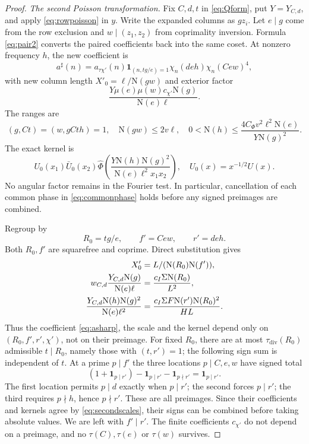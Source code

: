 \documentclass[11pt,a4paper]{article}
\numberwithin{equation}{section}
\theoremstyle{definition}
\theoremstyle{remark}
\newcommand{\N}{\mathrm N}
\newcommand{\ind}{\mathbf 1}
\newcommand{\wt}{\widehat}
\newcommand{\tauD}{\tau_{\mathrm{div}}}
\begin{document}
\begin{proof}
\emph{The second Poisson transformation.} Fix $C,d,t$ in \eqref{eq:Qform}, put $Y=Y_{C,d}$, and apply \eqref{eq:rowpoisson} in $y$. Write the expanded columns as $gz_i$. Let $e\mid g$ come from the row exclusion and $w\mid(z_1,z_2)$ from coprimality inversion. Formula \eqref{eq:pair2} converts the paired coefficients back into the same coset. At nonzero frequency $h$, the new coefficient is
\begin{equation}\label{eq:asharp}
 a^\sharp(n)=a_{\tau\chi'}(n)\ind_{(n,tg/e)=1}\chi_n(deh)\chi_n(Cew)^4,
\end{equation}
with new column length $X'_0=\ell/\N(gw)$ and exterior factor
\[
 \frac{Y\mu(e)\mu(w)c_{\chi'}\N(g)}{\N(e)\ell}.
\]
The ranges are
\[
 (g,Ct)=(w,gCth)=1,\quad \N(gw)\le2v\ell,\quad
 0<\N(h)\le\frac{4C_\Phi v^2\ell^2\N(e)}{Y\N(g)^2}.
\]
The exact kernel is
\[
 U_0(x_1)\bar U_0(x_2)
 \wt\Phi\left(\frac{Y\N(h)\N(g)^2}{\N(e)\ell^2x_1x_2}\right),\quad U_0(x)=x^{-1/2}U(x).
\]
No angular factor remains in the Fourier test. In particular, cancellation of each common phase in \eqref{eq:commonphase} holds before any signed preimages are combined.

Regroup by
\[
 R_0=tg/e,\qquad f'=Cew,\qquad r'=deh.
\]
Both $R_0,f'$ are squarefree and coprime. Direct substitution gives
\begin{align}\label{eq:secondscales}
 X'_0&=L/(\N(R_0)\N(f')),\\
 w_{C,d}\frac{Y_{C,d}\N(g)}{\N(e)\ell}&=\frac{c_I\Sigma\N(R_0)}{L^2},\notag\\
 \frac{Y_{C,d}\N(h)\N(g)^2}{\N(e)\ell^2}
 &=\frac{c_I\Sigma F\N(r')\N(R_0)^2}{HL}.\notag
\end{align}
Thus the coefficient \eqref{eq:asharp}, the scale and the kernel depend only on $(R_0,f',r',\chi')$, not on their preimage. For fixed $R_0$, there are at most $\tauD(R_0)$ admissible $t\mid R_0$, namely those with $(t,r')=1$; the following sign sum is independent of $t$. At a prime $p\mid f'$ the three locations $p\mid C,e,w$ have signed total
\begin{equation}\label{eq:preimages}
 (1+\ind_{p\mid r'})-\ind_{p\mid r'}-\ind_{p\nmid r'}=\ind_{p\mid r'}.
\end{equation}
The first location permits $p\mid d$ exactly when $p\mid r'$; the second forces $p\mid r'$; the third requires $p\nmid h$, hence $p\nmid r'$. These are all preimages. Since their coefficients and kernels agree by \eqref{eq:secondscales}, their signs can be combined before taking absolute values. We are left with $f'\mid r'$. The finite coefficients $c_{\chi'}$ do not depend on a preimage, and no $\tau(C),\tau(e)$ or $\tau(w)$ survives.


\end{proof}
\end{document}
